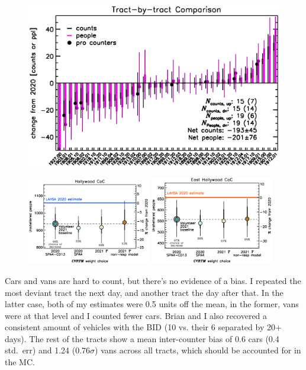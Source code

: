 \documentclass[11pt]{article}
\begin{document}
\begin{figure}[]
	\centering
	\includegraphics[width = \textwidth, trim = 0cm 0cm 0cm 0cm]{tractsYrYr}
	\caption{}
	\label{fig:tcomp}
\end{figure}

\begin{figure}[]
	\centering
	\includegraphics[width = 0.48\textwidth, trim = 1cm 0cm 0cm 1cm]{hwoodFinal}
	\includegraphics[width = 0.48\textwidth, trim = 1cm 0cm 0cm 1cm]{ehoFinal}
	\caption{}
	\label{fig:wtComp}
\end{figure}




Cars and vans are hard to count, but there's no evidence of a bias. I repeated the most deviant tract the next day, 
and another tract the day after that. In the latter case, both of my estimates were 0.5 units off the mean, in the 
former, vans were at that level and I counted fewer cars. Brian and I also recovered a consistent amount of vehicles 
with the BID (10 vs. their 6 separated by 20+ days). The rest of the tracts show a mean inter-counter bias of 0.6 
cars (0.4 std.~err) and 1.24 ($0.76\sigma$) vans across all tracts, which should be accounted for in the MC.
\end{document}
